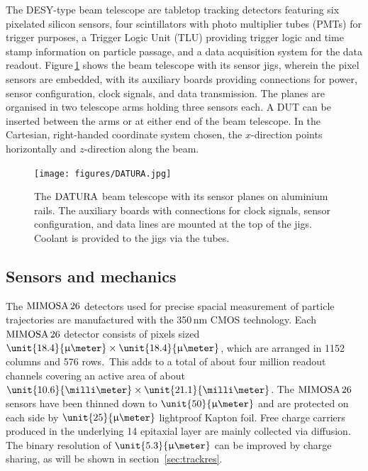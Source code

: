 
The DESY-type beam telescope are tabletop tracking detectors featuring six pixelated silicon sensors, four scintillators with photo multiplier tubes (PMTs) for trigger purposes,
 a Trigger Logic Unit (TLU) providing trigger logic and time stamp information on particle passage, and a data acquisition system for the data readout. 
Figure\,\ref{fig:datura-tscope} shows the beam telescope with its sensor jigs, wherein the pixel sensors are embedded, with its auxiliary boards providing connections for power,
 sensor configuration, clock signals, and data transmission. 
The planes are organised in two telescope arms holding three sensors each. 
A DUT can be inserted between the arms or at either end of the beam telescope. 
In the Cartesian, right-handed coordinate system chosen, the $x$-direction points horizontally and $z$-direction along the beam.

\begin{figure}[tb]
	\center
	\texttt{[image: figures/DATURA.jpg]}
	\caption[The $\Datura$ telescope]{The $\Datura$ beam telescope with its sensor planes on aluminium rails.
	The auxiliary boards with connections for clock signals, sensor configuration, and data lines are mounted at the top of the jigs.
	Coolant is provided to the jigs via the tubes.}
	\label{fig:datura-tscope}
\end{figure}
 
\subsection{Sensors and mechanics}

The $\textrm{MIMOSA\,26}$ detectors used for precise spacial measurement of particle trajectories are manufactured with the 350\,nm CMOS technology. 
Each $\textrm{MIMOSA\,26}$ detector consists of pixels sized $\unit{18.4}{\upmu\meter} \times \unit{18.4}{\upmu\meter}$, which are arranged in 1152 columns and 576 rows.\,\cite{HuGuo2010480}
This adds to a total of about four million readout channels covering an active area of about $\unit{10.6}{\milli\meter} \times \unit{21.1}{\milli\meter}$. 
The $\textrm{MIMOSA\,26}$ sensors have been thinned down to $\unit{50}{\upmu\meter}$ and are protected on each side by $\unit{25}{\upmu\meter}$ lightproof Kapton foil. 
Free charge carriers produced in the underlying \unit{14}{\upmu\meter} epitaxial layer are mainly collected via diffusion. 
The binary resolution of $\unit{5.3}{\upmu\meter}$ can be improved by charge sharing, as will be shown in section~\ref{sec:trackres}.

